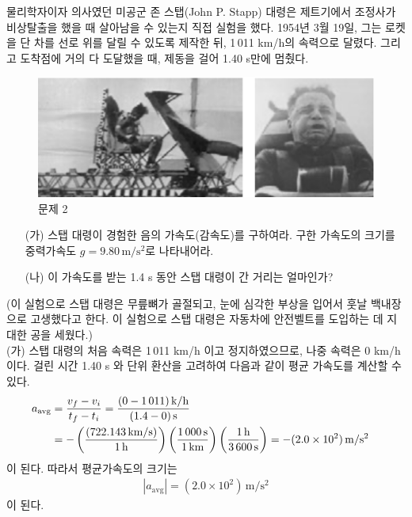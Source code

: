 \documentclass[APS,floatfix,nofootinbib,superscriptaddress,fleqn,preprint]{revtex4}
\begin{document}
물리학자이자 의사였던 미공군 존 스탭(John P. Stapp) 대령은 제트기에서
조정사가 비상탈출을 했을 때 살아남을 수 있는지 직접 실험을
했다. 1954년 3월 19일, 그는 로켓을 단 차를 선로 위를 달릴 수 있도록
제작한 뒤,  1\,011 km/h의 속력으로 달렸다. 그리고 도착점에 거의 다
도달했을 때, 제동을 걸어 1.40 s만에 멈췄다. 
\begin{figure}[htp]
  \centering
\includegraphics[scale=0.5]{Qfig3-2-20220307.png}  
  \caption{문제 2}
  \label{fig:2}
\end{figure}
\begin{itemize}
\item[(가)] 스탭 대령이 경험한 음의 가속도(감속도)를 구하여라. 구한
  가속도의 크기를 중력가속도 $g=9.80\,\mathrm{m/s^2}$로 나타내어라.
\item[(나)] 이 가속도를 받는 1.4 s  동안 스탭 대령이 간 거리는 얼마인가?
\end{itemize}
(이 실험으로 스탭 대령은 무릎뼈가 골절되고, 눈에 심각한 부상을 입어서
훗날 백내장으로 고생했다고 한다. 이 실험으로 스탭 대령은 자동차에 안전벨트를
도입하는 데 지대한 공을 세웠다.) \\
(가) 스탭 대령의 처음 속력은 1\,011 km/h 이고
    정지하였으므로, 나중 속력은 0 km/h 이다. 걸린 시간 1.40 s 와 단위
    환산을 고려하여 다음과 같이 평균 가속도를 계산할 수 있다. 
  \begin{align}
    a_{\mathrm{avg}} &= \frac{v_f-v_i}{t_f-t_i} =
              \frac{(0-1\,011)\,\mathrm{k/h}}{(1.4-0)\,\mathrm{s}} \cr
              &= -\left(\frac{(722.143\,\mathrm{km/s})}{1\,\mathrm{h}} \right)
                \left( \frac{1\,000\,\mathrm{s}}{1\,\mathrm{km}}\right)
                \left(\frac{1\,\mathrm{h}}{3\,600\,\mathrm{s}}\right)
                = - (2.0\times 10^2)\,\mathrm{m/s^2}
  \end{align} 
  이 된다. 따라서 평균가속도의 크기는 
  \begin{align*}
|a_{\mathrm{avg}}| =  (2.0\times 10^2)\,\mathrm{m/s^2}   
  \end{align*}
이 된다. 
\end{document}
